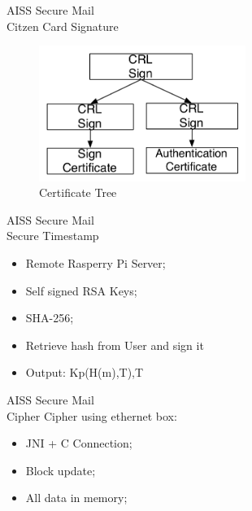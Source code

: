 \begin{frame}{AISS Secure Mail \\ \small Citzen Card Signature}
\begin{figure}
	\centering
	\includegraphics[width=0.6\textwidth]{./images/certificate.pdf}	
 	\caption{Certificate Tree}
	\label{fig:}
\end{figure}

\end{frame}


\begin{frame}{AISS Secure Mail \\ \small Secure Timestamp}
\begin{itemize}
\item Remote Rasperry Pi Server;
\item Self signed RSA Keys;
\item SHA-256;
\item Retrieve hash from User and sign it
\item Output: Kp(H(m),T),T
\end{itemize}		
\end{frame}


\begin{frame}{AISS Secure Mail \\ \small Cipher}
Cipher using ethernet box:
\begin{itemize}
\item JNI + C Connection;
\item Block update;
\item All data in memory;
\end{itemize}			
\end{frame}




